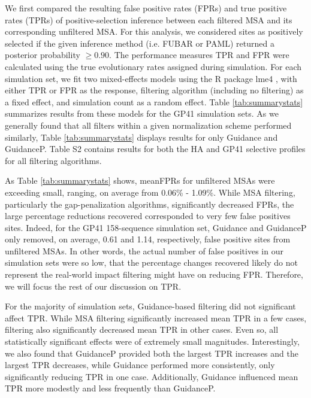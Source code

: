 \documentclass[11pt]{article}
\begin{document}
We first compared the resulting false positive rates (FPRs) and true positive rates (TPRs) of positive-selection inference between each filtered MSA and its corresponding unfiltered MSA. For this analysis, we considered sites as positively selected if the given inference method (i.e. FUBAR or PAML) returned a posterior probability $\geq0.90$. The performance measures TPR and FPR were calculated using the true evolutionary rates assigned during simulation. For each simulation set, we fit two mixed-effects models using the R package lme4 \citep{Bates2012}, with either TPR or FPR as the response, filtering algorithm (including no filtering) as a fixed effect, and simulation count as a random effect. Table \ref{tab:summarystats} summarizes results from these models for the GP41 simulation sets. As we generally found that all filters within a given normalization scheme performed similarly, Table \ref{tab:summarystats} displays results for only Guidance and GuidanceP. Table S2 contains results for both the HA and GP41 selective profiles for all filtering algorithms.

As Table \ref{tab:summarystats} shows, meanFPRs for unfiltered MSAs were exceeding small, ranging, on average from 0.06\% - 1.09\%. While MSA filtering, particularly the gap-penalization algorithms, significantly decreased FPRs, the large percentage reductions recovered corresponded to very few false positives sites. Indeed, for the GP41 158-sequence simulation set, Guidance and GuidanceP only removed, on average, 0.61 and 1.14, respectively, false positive sites from unfiltered MSAs. In other words, the actual number of false positives in our simulation sets were so low, that the percentage changes recovered likely do not represent the real-world impact filtering might have on reducing FPR. Therefore, we will focus the rest of our discussion on TPR.

For the majority of simulation sets, Guidance-based filtering did not significant affect TPR. While MSA filtering significantly increased mean TPR in a few cases, filtering also significantly decreased mean TPR in other cases. Even so, all statistically significant effects were of extremely small magnitudes. Interestingly, we also found that GuidanceP provided both the largest TPR increases and the largest TPR decreases, while Guidance performed more consistently, only significantly reducing TPR in one case. Additionally, Guidance influenced mean TPR more modestly and less frequently than GuidanceP.
\end{document}

